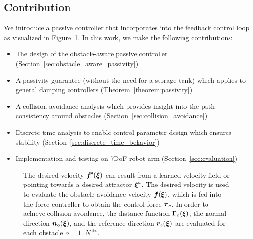 \subsection{Contribution}
We introduce a passive controller that incorporates into the feedback control loop as visualized in Figure~\ref{fig:control_scheme_passive}. 
In this work, we make the following contributions:
\begin{itemize}
\item The design of the obstacle-aware passive controller
(Section~\ref{sec:obstacle_aware_passivity})
\item A passivity guarantee (without the need for a storage tank) which applies to general damping controllers (Theorem~\ref{theorem:passivity})
\item A collision avoidance analysis which provides insight into the path consistency around obstacles (Section~\ref{sec:collision_avoidance})
\item Discrete-time analysis to enable control parameter design which ensures stability (Section~\ref{sec:discrete_time_behavior})
\item Implementation and testing on 7DoF robot arm (Section~\ref{sec:evaluation})
\end{itemize}


\begin{figure}[thb]
  \center
  
\caption{The desired velocity $\boldsymbol{f}^b(\boldsymbol{\xi})$ can result from a learned velocity field or pointing towards a desired attractor $\boldsymbol{\xi}^a$. The desired velocity is used to evaluate the obstacle avoidance velocity $\boldsymbol{f}(\boldsymbol{\xi})$, which is fed into the force controller to obtain the control force $\boldsymbol{\tau}_c$. In order to achieve collision avoidance, the distance function $\Gamma_o(\boldsymbol{\xi})$, the normal direction $\boldsymbol{n}_o(\boldsymbol{\xi})$, and the reference direction $\boldsymbol{r}_o(\boldsymbol{\xi})$ are evaluated for each obstacle $o = 1 .. N^\mathrm{{obs}}$.}
\label{fig:control_scheme_passive}
\end{figure}
